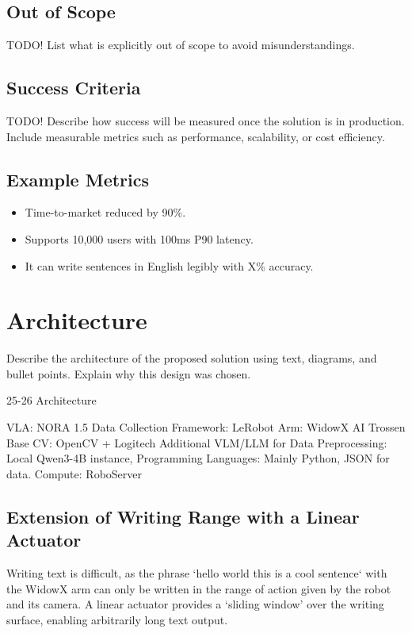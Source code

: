 \documentclass[12pt,a4paper]{article}
\begin{document}
\subsection{Out of Scope}
TODO! List what is explicitly out of scope to avoid misunderstandings.

\subsection{Success Criteria}
TODO! Describe how success will be measured once the solution is in production.  
Include measurable metrics such as performance, scalability, or cost efficiency.

\subsection*{Example Metrics}
\begin{itemize}
  \item Time-to-market reduced by 90\%.
  \item Supports 10,000 users with 100ms P90 latency.
  \item It can write sentences in English legibly with X\% accuracy.
\end{itemize}
\newpage
\section{Architecture}
Describe the architecture of the proposed solution using text, diagrams, and bullet points.  
Explain why this design was chosen.

25-26 Architecture

VLA: NORA 1.5
Data Collection Framework: LeRobot
Arm: WidowX AI Trossen Base
CV: OpenCV + Logitech
Additional VLM/LLM for Data Preprocessing: Local Qwen3-4B instance,
Programming Languages: Mainly Python, JSON for data.
Compute: RoboServer

\subsection{Extension of Writing Range with a Linear Actuator}

Writing text is difficult, as the phrase `hello world this is a cool sentence` with the WidowX arm can only be written in the range of action given by the robot and its camera. A linear actuator provides a `sliding window' over the writing surface, enabling arbitrarily long text output.
\end{document}
